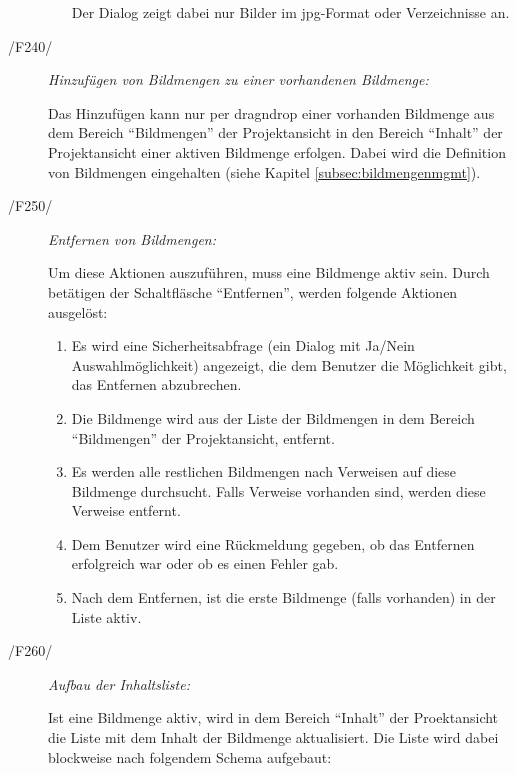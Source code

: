 \begin{description}
\begin{itemize}
\begin{itemize}
					\end{itemize}
				
				Der Dialog zeigt dabei nur Bilder im \gls{jpg}-Format oder Verzeichnisse an.
				
			\end{itemize}
		
		\item[/F240/] \textit{Hinzufügen von Bildmengen zu einer vorhandenen Bildmenge:}\par Das Hinzufügen kann nur per \gls{dragndrop} einer vorhanden Bildmenge aus dem Bereich "`Bildmengen"' der Projektansicht in den Bereich "`Inhalt"' der Projektansicht einer aktiven Bildmenge erfolgen. Dabei wird die Definition von Bildmengen eingehalten (siehe Kapitel \ref{subsec:bildmengenmgmt}).
		
		\item[/F250/] \textit{Entfernen von Bildmengen:}\par Um diese Aktionen auszuführen, muss eine Bildmenge aktiv sein. Durch betätigen der Schaltfläsche "`Entfernen"', werden folgende Aktionen ausgelöst:
			
			\begin{enumerate}
			
				\item Es wird eine Sicherheitsabfrage (ein Dialog mit Ja/Nein Auswahlmöglichkeit) angezeigt, die dem Benutzer die Möglichkeit gibt, das Entfernen abzubrechen.
				
				\item Die Bildmenge wird aus der Liste der Bildmengen in dem Bereich "`Bildmengen"' der Projektansicht, entfernt.
				
				\item Es werden alle restlichen Bildmengen nach Verweisen auf diese Bildmenge durchsucht. Falls Verweise vorhanden sind, werden diese Verweise entfernt.
				
				\item Dem Benutzer wird eine Rückmeldung gegeben, ob das Entfernen erfolgreich war oder ob es einen Fehler gab.
				
				\item Nach dem Entfernen, ist die erste Bildmenge (falls vorhanden) in der Liste aktiv.
			
			\end{enumerate}

		\item[/F260/] \textit{Aufbau der Inhaltsliste:}\par Ist eine Bildmenge aktiv, wird in dem Bereich "`Inhalt"' der Proektansicht die Liste mit dem Inhalt der Bildmenge aktualisiert. Die Liste wird dabei blockweise nach folgendem Schema aufgebaut:
		

\end{description}
